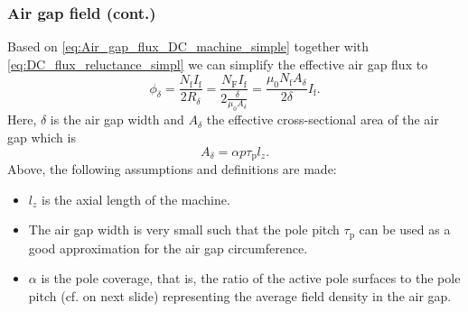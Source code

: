 \begin{frame}
	\frametitle{Air gap field (cont.)}
	Based on \eqref{eq:Air_gap_flux_DC_machine_simple} together with \eqref{eq:DC_flux_reluctance_simpl} we can simplify the effective air gap flux to
	\begin{equation}
		\phi_\delta = \frac{N_\mathrm{f} I_\mathrm{f}}{2 R_\delta} = \frac{N_\mathrm{F} I_\mathrm{f}}{2 \frac{\delta}{\mu_0 A_\delta}} = \frac{\mu_0 N_\mathrm{f} A_\delta}{2 \delta} I_\mathrm{f}.
		\label{eq:Air_gap_flux_DC_machine}
	\end{equation}\pause
	Here, $\delta$ is the air gap width and $A_\delta$ the effective cross-sectional area of the air gap which is
	\begin{equation}
		A_\delta = \alpha p \tau_\mathrm{p} l_z .
		\label{eq:Air_gap_area_DC_machine}
	\end{equation}\pause
	Above, the following assumptions and definitions are made:
	\begin{itemize}
		\item $l_z$ is the axial length of the machine. \pause
		\item The air gap width is very small such that the pole pitch $\tau_\mathrm{p}$ can be used as a good approximation for the air gap  circumference. \pause
		\item $\alpha$ is the pole coverage, that is, the ratio of the active pole surfaces to the pole pitch (cf.  on next slide) representing the average field density in the air gap.
	\end{itemize}
\end{frame}


